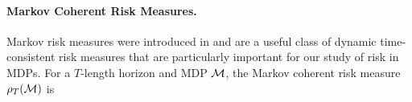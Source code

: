 \documentclass{article} %
\newcommand{\citet}{\cite}
\begin{document}

%

\vspace{-0.1in}
\paragraph{Markov Coherent Risk Measures.}
Markov risk measures were introduced in \citet{ruszczynski2010risk} and are a useful class of dynamic time-consistent risk measures that are particularly important for our study of risk in MDPs.
For a $T$-length horizon and MDP $\mathcal{M}$, the Markov coherent risk measure $\rho_T(\mathcal{M})$ is
\end{document}
